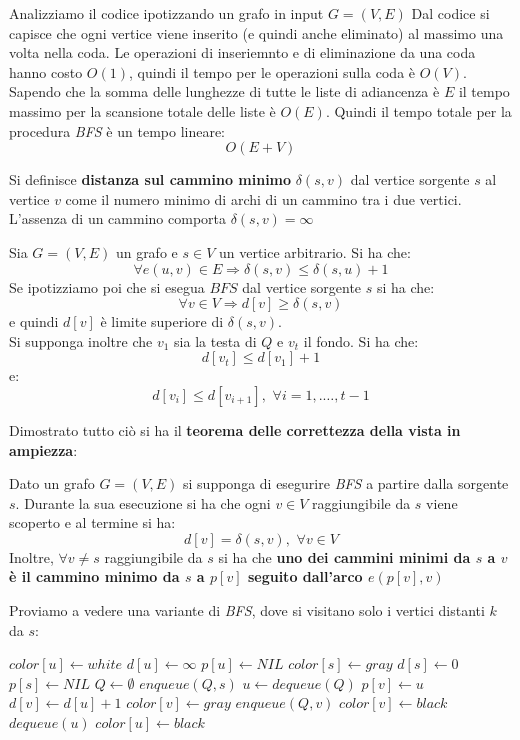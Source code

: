 \documentclass[a4paper,12pt, oneside]{book}
\begin{document}
Analizziamo il codice ipotizzando un grafo in input $G=(V,E)$
Dal codice si capisce che ogni vertice viene inserito (e quindi anche
eliminato) al massimo una volta nella coda. Le operazioni di
inseriemnto e di eliminazione da una coda hanno costo $O(1)$, quindi
il tempo per le operazioni sulla coda è $O(V)$. Sapendo che la somma
delle lunghezze di tutte le liste di adiancenza è $E$ il tempo massimo
per la scansione totale delle liste è $O(E)$. Quindi il tempo totale
per la procedura \textit{BFS} è un tempo lineare:
\[O(E+V)\]
\begin{definizione}
  Si definisce \textbf{distanza sul cammino minimo} $\delta(s,v)$ dal
  vertice sorgente $s$ al vertice $v$ come il numero minimo di archi
  di un cammino tra i due vertici. L'assenza di un cammino comporta $\delta(s,v)=\infty$
\end{definizione}
\begin{lemma}
  Sia $G=(V,E)$ un grafo e $s\in V$ un vertice arbitrario. Si ha che:
  \[\forall e(u,v)\in E \Longrightarrow \delta(s,v)\leq\delta(s,u)+1\]
  Se ipotizziamo poi che si esegua $BFS$ dal vertice sorgente $s$ si
  ha che:
  \[\forall v\in V \Longrightarrow d[v]\geq \delta(s,v)\]
  e quindi $d[v]$ è limite superiore di $\delta(s,v)$.\\
  Si supponga inoltre che $v_1$ sia la testa di $Q$ e $v_t$ il
  fondo. Si ha che:
  \[d[v_t]\leq d[v_1]+1\]
  e:
  \[d[v_i]\leq d[v_{i+1}],\,\, \forall i=1,.\ldots, t-1\]
\end{lemma}
Dimostrato tutto ciò si ha il \textbf{teorema delle correttezza della
  vista in ampiezza}:
\begin{teorema}
  Dato un grafo $G=(V,E)$ si supponga di esegurire \textit{BFS} a
  partire dalla sorgente $s$. Durante la sua esecuzione si ha che
  ogni $v\in V$ raggiungibile da $s$ viene scoperto e al termine si
  ha:
  \[d[v]=\delta(s,v),\,\,\forall v\in V\]
  Inoltre, $\forall v\neq s$ raggiungibile da $s$ si ha che
  \textbf{uno dei cammini minimi da $s$ a $v$ è il cammino minimo da
    $s$ a $p[v]$ seguito dall'arco $e(p[v],v)$}
\end{teorema}
Proviamo a vedere una variante di \textit{BFS}, dove si visitano solo
i vertici distanti $k$ da $s$:
\begin{algorithm}[H]
  \begin{algorithmic}[1]
    \State $color[u]\gets white$
    \State $d[u]\gets \infty$
    \State $p[u]\gets NIL$
    \EndFor
    \State $color[s]\gets gray$
    \State $d[s]\gets 0$
    \State $p[s]\gets NIL$
    \State $Q\gets \emptyset$
    \State $enqueue(Q,s)$
    \State $u\gets dequeue(Q)$
    \State $p[v]\gets u$
    \State $d[v]\gets d[u]+1$
    \State $color[v]\gets gray$
    \State $enqueue(Q,v)$
    \Else
    \State $color[v]\gets black$
    \EndIf
    \EndIf
    \EndFor
    \State $dequeue(u)$
    \State $color[u]\gets black$ 
    \EndWhile
    \EndFunction
  \end{algorithmic}
\end{algorithm}
\end{document}
